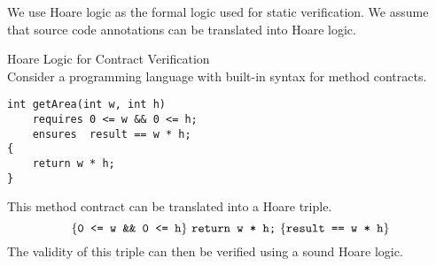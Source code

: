 We use Hoare logic \cite{hoare1969axiomatic} as the formal logic used for static verification.
We assume that source code annotations can be translated into Hoare logic.

\begin{example}{Hoare Logic for Contract Verification}~\\
    Consider a programming language with built-in syntax for method contracts.
    \begin{lstlisting}
int getArea(int w, int h)
    requires 0 <= w && 0 <= h;
    ensures  result == w * h;
{
    return w * h;
}
    \end{lstlisting}
    This method contract can be translated into a Hoare triple.
    \begin{displaymath}
    \{{\textup{\texttt{0 <= w \&\& 0 <= h}}}\} ~{\textup{\texttt{return w * h;}}}~ \{{\textup{\texttt{result == w * h}}}\}
    \end{displaymath}
    The validity of this triple can then be verified using a sound Hoare logic.
\end{example}
